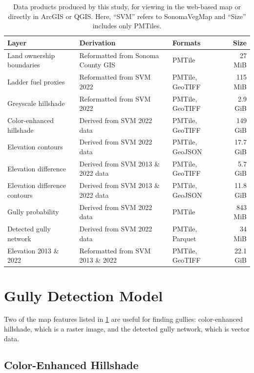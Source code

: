 \begin{table}
\centering
\small
\begin{tabular}{l l l r}
\toprule
\textbf{Layer} & \textbf{Derivation} & \textbf{Formats} & \textbf{Size} \\
\midrule
Land ownership boundaries & Reformatted from Sonoma County GIS & PMTile & 27 MiB \\
Ladder fuel proxies & Reformatted from SVM 2022 & PMTile, GeoTIFF & 115 MiB \\
Greyscale hillshade & Reformatted from SVM 2022 & PMTile, GeoTIFF & 2.9 GiB \\
Color-enhanced hillshade & Derived from SVM 2022 data & PMTile, GeoTIFF & 149 GiB \\
Elevation contours & Derived from SVM 2022 data & PMTile, GeoJSON & 17.7 GiB \\
Elevation difference & Derived from SVM 2013 \& 2022 data & PMTile, GeoTIFF & 5.7 GiB \\
Elevation difference contours & Derived from SVM 2013 \& 2022 data & PMTile, GeoJSON & 11.8 GiB \\
Gully probability & Derived from SVM 2022 data & PMTile & 843 MiB \\
Detected gully network & Derived from SVM 2022 data & PMTile, Parquet & 34 MiB \\
Elevation 2013 \& 2022 & Reformatted from SVM 2013 \& 2022 & PMTile, GeoTIFF & 22.1 GiB \\
\bottomrule
\end{tabular}

\caption{Data products produced by this study, for viewing in the web-based map or directly in ArcGIS or QGIS. Here, ``SVM'' refers to SonomaVegMap and ``Size'' includes only PMTiles.\label{tab:data-products}}
\end{table}

\section{Gully Detection Model}

Two of the map features listed in \cref{tab:data-products} are useful for finding gullies: color-enhanced hillshade, which is a raster image, and the detected gully network, which is vector data.

\subsection{Color-Enhanced Hillshade}

